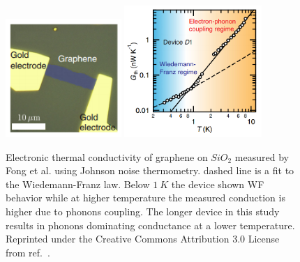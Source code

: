 \begin{figure}
\centering
\includegraphics[height=45mm, valign=t]{figures/high_density_graphene/Fong_picture.png}
\includegraphics[height=50mm, valign=t]{figures/high_density_graphene/Fong_Gth.png}
\caption{Electronic thermal conductivity of graphene on $SiO_2$ measured by Fong et al. using Johnson noise thermometry. dashed line is a fit to the Wiedemann-Franz law. Below $1~K$ the device shown WF behavior while at higher temperature the measured conduction is higher due to phonons coupling. The longer device in this study results in phonons dominating conductance at a lower temperature. Reprinted under the Creative Commons Attribution 3.0 License from ref.~\cite{fong_measurement_2013}.}
\label{fig:Fong_Gth}
\end{figure}

